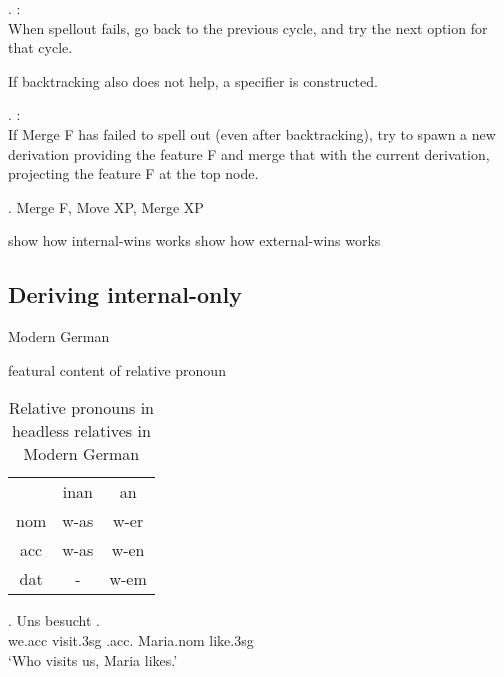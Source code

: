 \ex.  \citep{starke2018}:\\
When spellout fails, go back to the previous cycle, and try the next option for that cycle.\label{ex:backtracking}

If backtracking also does not help, a specifier is constructed.

\ex.  \citep{starke2018}:\\
If Merge F has failed to spell out (even after backtracking), try to spawn a new derivation providing the feature F and merge that with the current derivation, projecting the feature F at the top node.\label{ex:specformation}

\ex. Merge F, Move XP, Merge XP

show how internal-wins works
show how external-wins works

\subsection{Deriving internal-only}

Modern German

featural content of relative pronoun

\begin{table}[H]
 \center
 \caption {Relative pronouns in headless relatives in Modern German}
  \begin{tabular}{ccc}
  \toprule
       & \ac{inan} & \ac{an} \\
        \cmidrule{2-3}
    \ac{nom}  & w-as     & w-er    \\
    \ac{acc}  & w-as     & w-en   \\
    \ac{dat}  & -      & w-em    \\
  \bottomrule
  \end{tabular}
\end{table}

\exg. Uns besucht   .\\
 we.\ac{acc} visit.3\ac{sg}\scsub{[nom]} .\ac{acc}. Maria.\ac{nom} like.3\ac{sg}\scsub{[acc]}\\
 `Who visits us, Maria likes.' 

